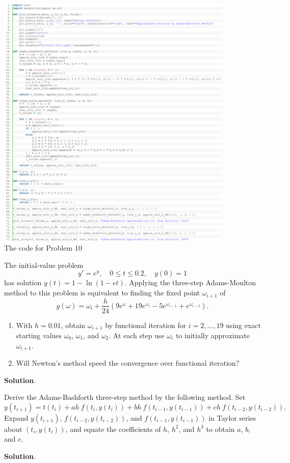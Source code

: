 \documentclass[11pt]{article}
\theoremstyle{break}
\numberwithin{equation}{theorem}
\begin{document}
\begin{center}
    \includegraphics[width=0.85\textwidth]{P10.png}\\
    The code for Problem 10
\end{center}


\newpage
\begin{problem}\label{problem 11} %
    The initial-value problem $$y'=e^y, \quad 0\leq t\leq 0.2, \quad y(0)=1$$ has solution $y(t)=1-\ln(1-et)$. Applying the three-step Adams-Moulton method to this problem is equivalent to finding the fixed point $\omega_{i+1}$ of $$g(\omega)=\omega_i+\dfrac{h}{24}\left(9e^\omega+19e^{\omega_i}-5e^{\omega_{i-1}}+e^{\omega_{i-2}}\right).$$
    \begin{enumerate}
        \item With $h = 0.01$, obtain $\omega_{i+1}$ by functional iteration for $i = 2, \dots , 19$ using exact starting values $\omega_0$, $\omega_1$, and $\omega_2$. At each step use $\omega_i$ to initially approximate $\omega_{i+1}$.
        \item Will Newton's method speed the convergence over functional iteration?
    \end{enumerate}
\end{problem}
\textbf{Solution}. 


\newpage
\begin{problem}\label{problem 12} %
    Derive the Adams-Bashforth three-step method by the following method. Set $$y(t_{i+1})=t(t_i)+ah\:f(t_i, y(t_i))+bh\:f(t_{i-1}, y(t_{i-1}))+ch\:f(t_{i-2}, y(t_{i-2})).$$ Expand $y(t_{i+1})$, $f(t_{i-2}, y(t_{i-2}))$, and $f(t_{i-1}, y(t_{i-1}))$ in Taylor series about $(t_i, y(t_i))$, and equate the coefficients of $h$, $h^2$, and $h^3$ to obtain $a$, $b$, and $c$.
\end{problem}
\textbf{Solution}. 
\end{document}
